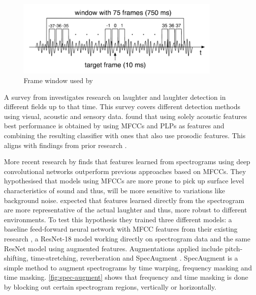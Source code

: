 \documentclass[bsc,frontabs,parskip,deptreport]{infthesis}
\begin{document}
\begin{figure}[htp]
    \centering
    \includegraphics[width=10cm]{imgs/Knox_window.png}
    \caption{Frame window used by \citet{knox2006automatic}}
    \label{fig:knox_window}
\end{figure}

A survey from \citet{cosentino2016quantitative} investigates research on laughter and laughter detection in different fields up to that time.
This survey covers different detection methods using visual, acoustic and sensory data.
\citet{cosentino2016quantitative} found that using solely acoustic features best performance is obtained by using MFCCs and PLPs as features and combining the resulting classifier with ones that also use prosodic features.
This aligns with findings from prior research \citep{truong2007automatic, knox2006automatic}.

More recent research by \citet{gillick2021robust} finds that features learned from spectrograms using deep convolutional networks outperform previous approaches based on MFCCs. 
They hypothesised that models using MFCCs are more prone to pick up surface level characteristics of sound and thus, will be more sensitive to variations like background noise.
\citet{gillick2021robust} expected that features learned directly from the spectrogram are more representative of the actual laughter and thus, more robust to different environments. 
To test this hypothesis they trained three different models: a baseline feed-forward neural network with MFCC features from their existing research \citep{ryokai2018capturing}, a ResNet-18 \citep{he2016deep} model working directly on spectrogram data and the same ResNet model using augmented features. Augmentations applied include pitch-shifting, time-stretching, reverberation and SpecAugment \citep{park2019specaugment}. SpecAugment is a simple method to augment spectrograms by time warping, frequency masking and time masking. \autoref{fig:spec-augment} shows that frequency and time masking is done by blocking out certain spectrogram regions, vertically or horizontally. 
\end{document}

